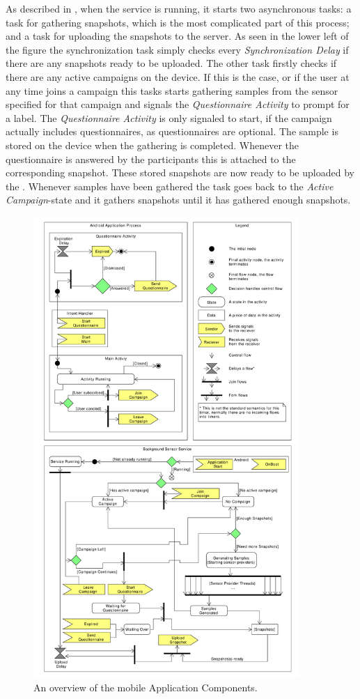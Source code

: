 As described in , when the service is running, it starts two asynchronous tasks: a task for gathering snapshots, which is the most complicated part of this process; and a task for uploading the snapshots to the server. As seen in the lower left of the figure the synchronization task simply checks every \emph{Synchronization Delay} if there are any snapshots ready to be uploaded. The other task firstly checks if there are any active campaigns on the device. If this is the case, or if the user at any time joins a campaign this tasks starts gathering samples from the sensor specified for that campaign and signals the \emph{Questionnaire Activity} to prompt for a label. The \emph{Questionnaire Activity} is only signaled to start, if the campaign actually includes questionnaires, as questionnaires are optional. The sample is stored on the device when the gathering is completed. Whenever the questionnaire is answered by the participants this is attached to the corresponding snapshot. These stored snapshots are now ready to be uploaded by the . Whenever samples have been gathered the task goes back to the \emph{Active Campaign}-state and it gathers snapshots until it has gathered enough snapshots.

\begin{figure}[!htbp]
    \centering
    \includegraphics[width=0.9\textwidth]{graphic/backgroundsensorservice/lifecyclestuff}
    \caption{An overview of the mobile Application Components.}
    \label{fig:system_currency_and_lifecycle}
\end{figure}
\FloatBarrier